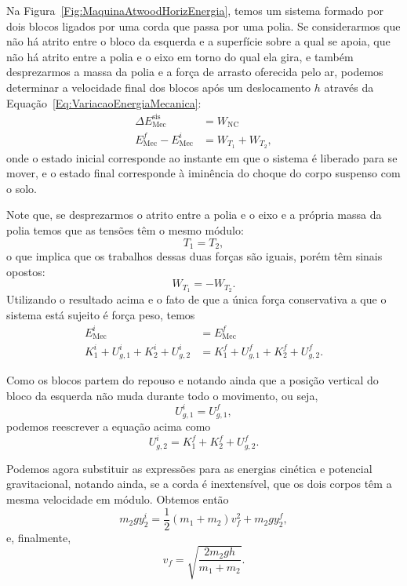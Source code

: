 Na Figura~\ref{Fig:MaquinaAtwoodHorizEnergia}, temos um sistema formado por dois blocos ligados por uma corda que passa por uma polia. Se considerarmos que não há atrito entre o bloco da esquerda e a superfície sobre a qual se apoia, que não há atrito entre a polia e o eixo em torno do qual ela gira, e também desprezarmos a massa da polia e a força de arrasto oferecida pelo ar, podemos determinar a velocidade final dos blocos após um deslocamento $h$ através da Equação~\eqref{Eq:VariacaoEnergiaMecanica}:
\begin{align}
        \Delta E_{\text{Mec}}^{\text{sis}} &= W_{\text{NC}} \\
        E_{\text{Mec}}^f - E_{\text{Mec}}^i &= W_{T_1} + W_{T_2},
\end{align}
%
onde o estado inicial corresponde ao instante em que o sistema é liberado para se mover, e o estado final  corresponde à iminência do choque do corpo suspenso com o solo.

Note que, se desprezarmos o atrito entre a polia e o eixo e a própria massa da polia temos que as tensões têm o mesmo módulo:
\begin{equation}
    T_1 = T_2,
\end{equation}
%
o que implica que os trabalhos dessas duas forças são iguais, porém têm sinais opostos:
\begin{equation}
    W_{T_1} = - W_{T_2}.
\end{equation}
%
Utilizando o resultado acima e o fato de que a única força conservativa a que o sistema está sujeito é força peso, temos
\begin{align}
    E_{\text{Mec}}^i &= E_{\text{Mec}}^f \\
    K_{1}^i + U_{g,1}^i + K_{2}^i + U_{g,2}^i &= K_{1}^f + U_{g,1}^f + K_{2}^f + U_{g,2}^f.
\end{align}

Como os blocos partem do repouso e notando ainda que a posição vertical do bloco da esquerda não muda durante todo o movimento, ou seja,
\begin{equation}
    U_{g,1}^i = U_{g,1}^f,
\end{equation}
%
podemos reescrever a equação acima como
\begin{equation}
    U_{g,2}^i = K_{1}^f + K_{2}^f + U_{g,2}^f.
\end{equation}

Podemos agora substituir as expressões para as energias cinética e potencial gravitacional, notando ainda, se a corda é inextensível, que os dois corpos têm a mesma velocidade em módulo. Obtemos então
\begin{equation}
    m_2gy_2^i = \frac{1}{2}(m_1+m_2) v_f^2 + m_2gy_2^f,
\end{equation}
%
e, finalmente,
\begin{equation}\label{Eq:VelocidadeMaquinaDeAtwood}
    v_f = \sqrt{\frac{2m_2gh}{m_1+m_2}}.
\end{equation}
    
